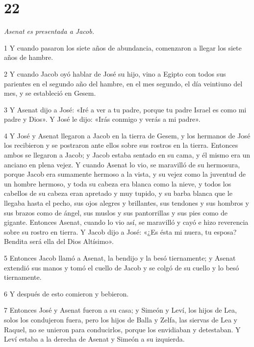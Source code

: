 \chapter{22}

\par \textit{Asenat es presentada a Jacob.}


\par 1 Y cuando pasaron los siete años de abundancia, comenzaron a llegar los siete años de hambre.

\par 2 Y cuando Jacob oyó hablar de José su hijo, vino a Egipto con todos sus parientes en el segundo año del hambre, en el mes segundo, el día veintiuno del mes, y se estableció en Gesem.

\par 3 Y Asenat dijo a José: «Iré a ver a tu padre, porque tu padre Israel es como mi padre y Dios». Y José le dijo: «Irás conmigo y verás a mi padre».

\par 4 Y José y Asenat llegaron a Jacob en la tierra de Gesem, y los hermanos de José los recibieron y se postraron ante ellos sobre sus rostros en la tierra. Entonces ambos se llegaron a Jacob; y Jacob estaba sentado en su cama, y ​​él mismo era un anciano en plena vejez. Y cuando Asenat lo vio, se maravilló de su hermosura, porque Jacob era sumamente hermoso a la vista, y su vejez como la juventud de un hombre hermoso, y toda su cabeza era blanca como la nieve, y todos los cabellos de su cabeza eran apretado y muy tupido, y su barba blanca que le llegaba hasta el pecho, sus ojos alegres y brillantes, sus tendones y sus hombros y sus brazos como de ángel, sus muslos y sus pantorrillas y sus pies como de gigante. Entonces Asenat, cuando lo vio así, se maravilló y cayó e hizo reverencia sobre su rostro en tierra. Y Jacob dijo a José: «¿Es ésta mi nuera, tu esposa? Bendita será ella del Dios Altísimo».

\par 5 Entonces Jacob llamó a Asenat, la bendijo y la besó tiernamente; y Asenat extendió sus manos y tomó el cuello de Jacob y se colgó de su cuello y lo besó tiernamente.

\par 6 Y después de esto comieron y bebieron.

\par 7 Entonces José y Asenat fueron a su casa; y Simeón y Leví, los hijos de Lea, solos los condujeron fuera, pero los hijos de Balla y Zelfa, las siervas de Lea y Raquel, no se unieron para conducirlos, porque los envidiaban y detestaban. Y Leví estaba a la derecha de Asenat y Simeón a su izquierda.

